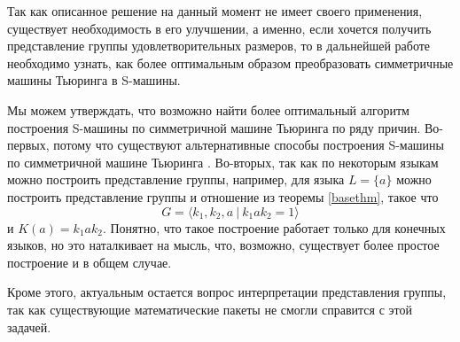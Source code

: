 \documentclass[14pt]{matmex-diploma-custom}
\begin{document}
Так как описанное решение на данный момент не имеет своего применения, существует необходимость в его улучшении, а именно, если хочется получить представление группы удовлетворительных размеров, то в дальнейшей работе необходимо узнать, как более оптимальным образом преобразовать симметричные машины Тьюринга в S-машины. 

Мы можем утверждать, что возможно найти более оптимальный алгоритм построения S-машины по симметричной машине Тьюринга по ряду причин.
Во-первых, потому что существуют альтернативные способы построения S-машины по симметричной машине Тьюринга \cite{SpaceFunc}.
Во-вторых, так как по некоторым языкам можно построить представление группы, например, для языка $L = \{a\}$ можно построить представление группы и отношение из теоремы \ref{basethm}, такое что 
$$G=\langle k_1, k_2, a ~|~ k_1 a k_2 = 1 \rangle$$ 
и $K(a) = k_1 a k_2$. Понятно, что такое построение работает только для конечных языков, но это наталкивает на мысль, что, возможно, существует более простое построение и в общем случае. 

Кроме этого, актуальным остается вопрос интерпретации представления группы, так как существующие математические пакеты не смогли справится с этой задачей. 
\end{document}
